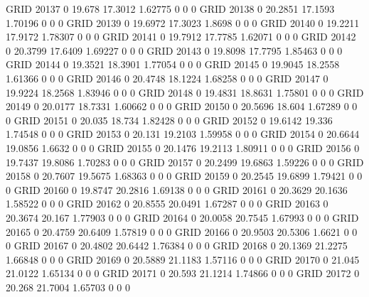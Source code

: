 GRID    20137   0       19.678  17.3012 1.62775 0       0       0       
GRID    20138   0       20.2851 17.1593 1.70196 0       0       0       
GRID    20139   0       19.6972 17.3023 1.8698  0       0       0       
GRID    20140   0       19.2211 17.9172 1.78307 0       0       0       
GRID    20141   0       19.7912 17.7785 1.62071 0       0       0       
GRID    20142   0       20.3799 17.6409 1.69227 0       0       0       
GRID    20143   0       19.8098 17.7795 1.85463 0       0       0       
GRID    20144   0       19.3521 18.3901 1.77054 0       0       0       
GRID    20145   0       19.9045 18.2558 1.61366 0       0       0       
GRID    20146   0       20.4748 18.1224 1.68258 0       0       0       
GRID    20147   0       19.9224 18.2568 1.83946 0       0       0       
GRID    20148   0       19.4831 18.8631 1.75801 0       0       0       
GRID    20149   0       20.0177 18.7331 1.60662 0       0       0       
GRID    20150   0       20.5696 18.604  1.67289 0       0       0       
GRID    20151   0       20.035  18.734  1.82428 0       0       0       
GRID    20152   0       19.6142 19.336  1.74548 0       0       0       
GRID    20153   0       20.131  19.2103 1.59958 0       0       0       
GRID    20154   0       20.6644 19.0856 1.6632  0       0       0       
GRID    20155   0       20.1476 19.2113 1.80911 0       0       0       
GRID    20156   0       19.7437 19.8086 1.70283 0       0       0       
GRID    20157   0       20.2499 19.6863 1.59226 0       0       0       
GRID    20158   0       20.7607 19.5675 1.68363 0       0       0       
GRID    20159   0       20.2545 19.6899 1.79421 0       0       0       
GRID    20160   0       19.8747 20.2816 1.69138 0       0       0       
GRID    20161   0       20.3629 20.1636 1.58522 0       0       0       
GRID    20162   0       20.8555 20.0491 1.67287 0       0       0       
GRID    20163   0       20.3674 20.167  1.77903 0       0       0       
GRID    20164   0       20.0058 20.7545 1.67993 0       0       0       
GRID    20165   0       20.4759 20.6409 1.57819 0       0       0       
GRID    20166   0       20.9503 20.5306 1.6621  0       0       0       
GRID    20167   0       20.4802 20.6442 1.76384 0       0       0       
GRID    20168   0       20.1369 21.2275 1.66848 0       0       0       
GRID    20169   0       20.5889 21.1183 1.57116 0       0       0       
GRID    20170   0       21.045  21.0122 1.65134 0       0       0       
GRID    20171   0       20.593  21.1214 1.74866 0       0       0       
GRID    20172   0       20.268  21.7004 1.65703 0       0       0       
